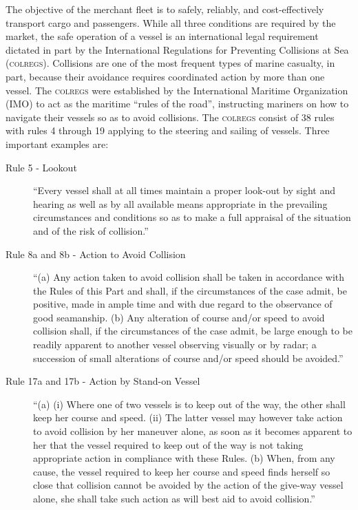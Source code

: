 \documentclass[twoside,symmetric,notoc]{tufte-book}
\begin{document}
\par{%
The objective of the merchant fleet is to safely, reliably, and cost-effectively transport cargo and passengers.\cite{Pinder} While all three conditions are required by the market, the safe operation of a vessel is an international legal requirement dictated in part by the International Regulations for Preventing Collisions at Sea (\textsc{colregs}).\cite{colregs} Collisions are one of the most frequent types of marine casualty, in part, because their avoidance requires coordinated action by more than one vessel.\cite{EMSA} The \textsc{colregs} were established by the International Maritime Organization (IMO) to act as the maritime ``rules of the road'', instructing mariners on how to navigate their vessels so as to avoid collisions.\cite{Benjamin} The \textsc{colregs} consist of 38 rules with rules 4 through 19 applying to the steering and sailing of vessels.\cite{USCG} Three important examples are:
\begin{description}
    \item[Rule 5 - Lookout] ``Every vessel shall at all times maintain a proper look-out by sight and hearing as well as by all available means appropriate in the prevailing circumstances and conditions so as to make a full appraisal of the situation and of the risk of collision.''
    
    \item[Rule 8a and 8b - Action to Avoid Collision] ``(a) Any action taken to avoid collision shall be taken in accordance with the Rules of this Part and shall, if the circumstances of the case admit, be positive, made in ample time and with due regard to the observance of good seamanship. (b) Any alteration of course and/or speed to avoid collision shall, if the circumstances of the case admit, be large enough to be readily apparent to another vessel observing visually or by radar; a succession of small alterations of course and/or speed should be avoided.''
    
    \item[Rule 17a and 17b - Action by Stand-on Vessel] ``(a) (i) Where one of two vessels is to keep out of the way, the other shall keep her course and speed. (ii) The latter vessel may however take action to avoid collision by her maneuver alone, as soon as it becomes apparent to her that the vessel required to keep out of the way is not taking appropriate action in compliance with these Rules. (b) When, from any cause, the vessel required to keep her course and speed finds herself so close that collision cannot be avoided by the action of the give-way vessel alone, she shall take such action as will best aid to avoid collision.''\cite{USCG}
\end{description}
}
\end{document}
